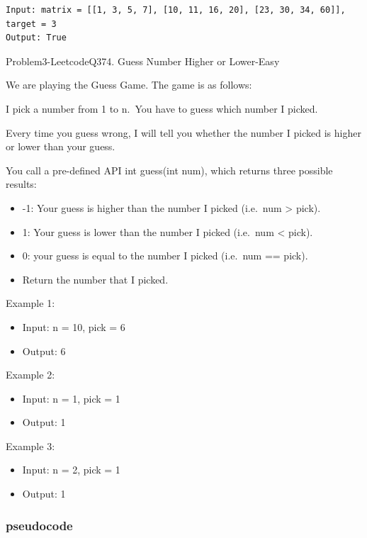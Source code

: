 \documentclass[11pt]{article}
\providecommand{\tightlist}{%
      \setlength{\itemsep}{0pt}\setlength{\parskip}{0pt}}
\begin{document}
    \begin{Verbatim}[commandchars=\\\{\}]
Input: matrix = [[1, 3, 5, 7], [10, 11, 16, 20], [23, 30, 34, 60]], target = 3
Output: True
    \end{Verbatim}

    Problem3-LeetcodeQ374. Guess Number Higher or Lower-Easy

We are playing the Guess Game. The game is as follows:

I pick a number from 1 to n.~You have to guess which number I picked.

Every time you guess wrong, I will tell you whether the number I picked
is higher or lower than your guess.

You call a pre-defined API int guess(int num), which returns three
possible results:

\begin{itemize}
\tightlist
\item
  -1: Your guess is higher than the number I picked (i.e.~num
  \textgreater{} pick).
\item
  1: Your guess is lower than the number I picked (i.e.~num \textless{}
  pick).
\item
  0: your guess is equal to the number I picked (i.e.~num == pick).
\item
  Return the number that I picked.
\end{itemize}

Example 1:

\begin{itemize}
\tightlist
\item
  Input: n = 10, pick = 6
\item
  Output: 6
\end{itemize}

Example 2:

\begin{itemize}
\tightlist
\item
  Input: n = 1, pick = 1
\item
  Output: 1
\end{itemize}

Example 3:

\begin{itemize}
\tightlist
\item
  Input: n = 2, pick = 1
\item
  Output: 1
\end{itemize}

    \subsubsection{pseudocode}\label{pseudocode}
\end{document}
